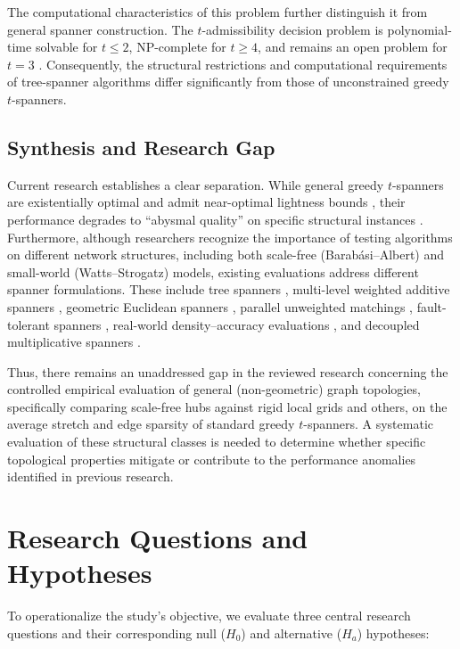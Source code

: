 \documentclass[conference]{IEEEtran}
\begin{document}
The computational characteristics of this problem further distinguish it from general spanner construction. The $t$-admissibility decision problem is polynomial-time solvable for $t \le 2$, NP-complete for $t \ge 4$, and remains an open problem for $t = 3$ \cite{ref11}. Consequently, the structural restrictions and computational requirements of tree-spanner algorithms differ significantly from those of unconstrained greedy $t$-spanners.

\subsection{Synthesis and Research Gap}
Current research establishes a clear separation. While general greedy $t$-spanners are existentially optimal \cite{ref5} and admit near-optimal lightness bounds \cite{ref17, ref18}, their performance degrades to ``abysmal quality'' on specific structural instances \cite{ref6, ref7}. Furthermore, although researchers recognize the importance of testing algorithms on different network structures, including both scale-free (Barab\'{a}si--Albert) and small-world (Watts--Strogatz) models, existing evaluations address different spanner formulations. These include tree spanners \cite{ref11, ref12}, multi-level weighted additive spanners \cite{ref10}, geometric Euclidean spanners \cite{ref8, ref9, ref7, ref22}, parallel unweighted matchings \cite{ref23}, fault-tolerant spanners \cite{ref26}, real-world density--accuracy evaluations \cite{ref20}, and decoupled multiplicative spanners \cite{ref6}.

Thus, there remains an unaddressed gap in the reviewed research concerning the controlled empirical evaluation of general (non-geometric) graph topologies, specifically comparing scale-free hubs against rigid local grids and others, on the average stretch and edge sparsity of standard greedy $t$-spanners. A systematic evaluation of these structural classes is needed to determine whether specific topological properties mitigate or contribute to the performance anomalies identified in previous research.


\section{Research Questions and Hypotheses}

To operationalize the study's objective, we evaluate three central research questions and their corresponding null ($H_0$) and alternative ($H_a$) hypotheses:
\end{document}
